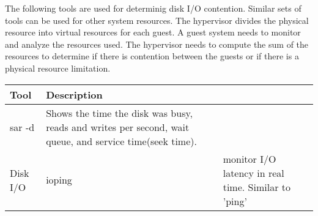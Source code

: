 The following tools are used for determinig disk I/O contention.  Similar sets of tools can be used for other system resources.  The hypervisor divides the physical resource into virtual resources for each guest.  A guest system needs to monitor and analyze the resources used.  The hypervisor needs to compute the sum of the resources to determine if there is contention between the guests or if there is a physical resource limitation.
\begin{tabular}{ l l p{5cm} }
  Tool & Description \\
  \hline
  sar -d & Shows the time the disk was busy, reads and writes per second, wait queue, and service time(seek time). \\
  Disk I/O & ioping & monitor I/O latency in real time. Similar to 'ping'\cite{oping}\\
\end{tabular}

\begin{comment}
  Uniform Memory & vmstat -a & Active and Inactive page statistics \\
  Uniform Memory & vmstat -s & Virtual Memory table \\
  NUMA Memory & zoneinfo & /proc/zoneinfo \\
  CPU & ps -o <FMT> & Real, system, and clock time \\
\end{comment}

\begin{comment}
       To see every process with a user-defined format:
          ps -eo pid,tid,class,rtprio,ni,pri,psr,pcpu,stat,wchan:14,comm
          ps axo stat,euid,ruid,tty,tpgid,sess,pgrp,ppid,pid,pcpu,comm
          ps -eo pid,tt,user,fname,tmout,f,wchan

PROCESS STATE CODES
       Here are the different values that the s, stat and state output
       specifiers (header "STAT" or "S") will display to describe the state of
       a process:
       D    uninterruptible sleep (usually IO)
       R    running or runnable (on run queue)
       S    interruptible sleep (waiting for an event to complete)
       T    stopped, either by a job control signal or because it is being
            traced.
       W    paging (not valid since the 2.6.xx kernel)
       X    dead (should never be seen)
       Z    defunct ("zombie") process, terminated but not reaped by its
            parent.
      For BSD formats and when the stat keyword is used, additional
       characters may be displayed:
       <    high-priority (not nice to other users)
       N    low-priority (nice to other users)
       L    has pages locked into memory (for real-time and custom IO)
       s    is a session leader
       l    is multi-threaded (using CLONE_THREAD, like NPTL pthreads do)
       +    is in the foreground process group.
\end{comment}

